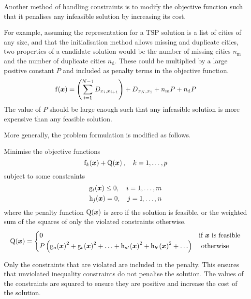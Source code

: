 Another method of handling constraints is to modify the objective function such that it penalises any infeasible solution by increasing its cost.

For example, assuming the representation for a TSP solution is a list of cities of any size, and that the initialisation method allows missing and duplicate cities, two properties of a candidate solution would be the number of missing cities \( n_{\mathrm{m}} \) and the number of duplicate cities \( n_{\mathrm{d}} \).
These could be multiplied by a large positive constant \( P \) and included as penalty terms in the objective function.
\begin{equation*}
  \function{f}{\boldsymbol{x}} = \left( \sum_{i=1}^{N-1} D_{x_{i},x_{i+1}} \right) + D_{x_{N},x_{1}} + n_{\mathrm{m}} P + n_{\mathrm{d}} P
\end{equation*}
The value of \( P \) should be large enough such that any infeasible solution is more expensive than any feasible solution.

More generally, the problem formulation is modified as follows.

Minimise the objective functions
\begin{equation*}
  \function[_{k}]{f}{\boldsymbol{x}} + \function{Q}{\boldsymbol{x}}, \quad k = 1, \ldots, p
\end{equation*}
subject to some constraints
\begin{gather*}
  \function[_{i}]{g}{\boldsymbol{x}} \leq 0, \quad i = 1, \ldots, m \\
  \function[_{j}]{h}{\boldsymbol{x}} = 0, \quad j = 1, \ldots, n
\end{gather*}
where the penalty function \( \function{Q}{\boldsymbol{x}} \) is zero if the solution is feasible, or the weighted sum of the squares of only the violated constraints otherwise.
\begin{equation*}
  \function{Q}{\boldsymbol{x}} = \begin{cases}
    0 & \text{if } \boldsymbol{x} \text{ is feasible} \\
    P \left( \function[_{a}]{g}{\boldsymbol{x}}^{2} + \function[_{b}]{g}{\boldsymbol{x}}^{2} + \ldots + \function[_{a'}]{h}{\boldsymbol{x}}^{2} + \function[_{b'}]{h}{\boldsymbol{x}}^{2} + \ldots \right) & \text{ otherwise}
  \end{cases}
\end{equation*}

Only the constraints that are violated are included in the penalty.
This ensures that unviolated inequality constraints do not penalise the solution.
The values of the constraints are squared to ensure they are positive and increase the cost of the solution.

